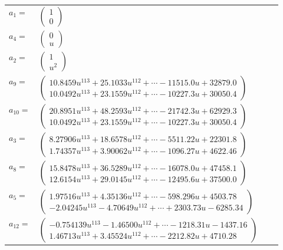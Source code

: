 \documentclass[1p]{elsarticle_modified}
\theoremstyle{definition}
\begin{document}
\begin{tabular}{m{7pt} m{180pt} m{7pt} m{180pt} }
\flushright $a_{1}=$&$\begin{pmatrix}1\\0\end{pmatrix}$ \\
\flushright $a_{4}=$&$\begin{pmatrix}0\\u\end{pmatrix}$ \\
\flushright $a_{2}=$&$\begin{pmatrix}1\\u^2\end{pmatrix}$ \\
\flushright $a_{9}=$&$\begin{pmatrix}10.8459 u^{113}+25.1033 u^{112}+\cdots-11515.0 u+32879.0\\10.0492 u^{113}+23.1559 u^{112}+\cdots-10227.3 u+30050.4\end{pmatrix}$ \\
\flushright $a_{10}=$&$\begin{pmatrix}20.8951 u^{113}+48.2593 u^{112}+\cdots-21742.3 u+62929.3\\10.0492 u^{113}+23.1559 u^{112}+\cdots-10227.3 u+30050.4\end{pmatrix}$ \\
\flushright $a_{3}=$&$\begin{pmatrix}8.27906 u^{113}+18.6578 u^{112}+\cdots-5511.22 u+22301.8\\1.74357 u^{113}+3.90062 u^{112}+\cdots-1096.27 u+4622.46\end{pmatrix}$ \\
\flushright $a_{8}=$&$\begin{pmatrix}15.8478 u^{113}+36.5289 u^{112}+\cdots-16078.0 u+47458.1\\12.6154 u^{113}+29.0145 u^{112}+\cdots-12495.6 u+37500.0\end{pmatrix}$ \\
\flushright $a_{5}=$&$\begin{pmatrix}1.97516 u^{113}+4.35136 u^{112}+\cdots-598.296 u+4503.78\\-2.04245 u^{113}-4.70649 u^{112}+\cdots+2303.73 u-6285.34\end{pmatrix}$ \\
\flushright $a_{12}=$&$\begin{pmatrix}-0.754139 u^{113}-1.46500 u^{112}+\cdots-1218.31 u-1437.16\\1.46713 u^{113}+3.45524 u^{112}+\cdots-2212.82 u+4710.28\end{pmatrix}$ \\

\end{tabular}
\end{document}

